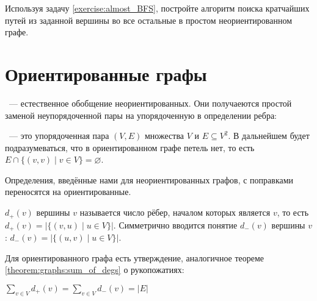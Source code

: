 \begin{Exercise}[counter=SecExercise]
    \noindent
    Используя задачу \ref{exercise:almost_BFS}, постройте алгоритм поиска кратчайших путей из заданной вершины во все остальные в простом неориентированном графе.
\end{Exercise}



\newpage



\section{Ориентированные графы}
\label{sec:oriented_graphs}

~--- естественное обобщение неориентированных.
Они получаеются простой заменой неупорядоченной пары на упорядоченную в определении ребра:
\begin{definition}
    ~--- это упорядоченная пара $ (V, E) $ множества  $ V $
    и  $ E \subseteq V^2 $.
    В дальнейшем будет подразумеваться, что в ориентированном графе петель нет, то есть $ E \cap \{(v, v) \mid v \in V \} = \varnothing $.
\end{definition}

Определения, введённые нами для неориентированных графов, с поправками переносятся на ориентированные.

\begin{definition}
     $ d_+(v) $ вершины $ v $ называется число рёбер, началом которых является $ v $,
    то есть $ d_+(v) = |\{ (v, u) \mid u \in V \}| $.
    Симметрично вводится понятие  $ d_-(v) $ вершины $ v $: $ d_-(v) = |\{ (u, v) \mid u \in V \}| $.
\end{definition}

Для ориентированного графа есть утверждение, аналогичное теореме \ref{theorem:graphs:sum_of_degs} о рукопожатиях:

\begin{statement}
    $ \displaystyle \sum_{v \in V} d_+(v) = \sum_{v \in V} d_-(v) = |E| $
\end{statement}

